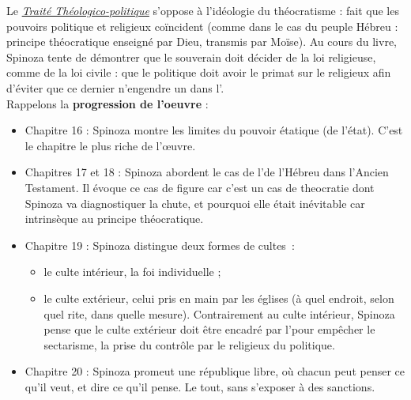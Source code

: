 \documentclass[a4paper,12pt]{article}
\newcommand{\ttp}[0]{\underline{\textit{Traité Théologico-politique}} }
\begin{document}
Le \ttp s'oppose à l'idéologie du théocratisme : fait que les pouvoirs politique et religieux coïncident (comme dans le cas du peuple Hébreu : principe théocratique enseigné par Dieu, transmis par Moïse). Au cours du livre, Spinoza tente de démontrer que le souverain doit décider de la loi religieuse, comme de la loi civile : que le politique doit avoir le primat sur le religieux afin d'éviter que ce dernier n'engendre un \etat dans l'\etat.\\

Rappelons la \textbf{progression de l'oeuvre} :
\begin{itemize}
    \item Chapitre 16 : Spinoza montre les limites du pouvoir étatique (de l'état). C'est le chapitre le plus riche de l'œuvre.
    \item Chapitres 17 et 18 : Spinoza abordent le cas de l'\etat de l'\etat Hébreu dans l'Ancien Testament. Il évoque ce cas de figure car c'est un cas de theocratie dont Spinoza va diagnostiquer la chute, et pourquoi elle était inévitable car intrinsèque au principe théocratique.
    \item Chapitre 19 : Spinoza distingue deux formes de cultes~: \begin{itemize}
        \item le culte intérieur, la foi individuelle ;
        \item le culte extérieur, celui pris en main par les églises (à quel endroit, selon quel rite, dans quelle mesure). Contrairement au culte intérieur, Spinoza pense que le culte extérieur doit être encadré par l'\etat pour empêcher le sectarisme, la prise du contrôle par le religieux du politique.
    \end{itemize}
    \item Chapitre 20 : Spinoza promeut une république libre, où chacun peut penser ce qu'il veut, et dire ce qu'il pense. Le tout, sans s'exposer à des sanctions.
\end{itemize}
\end{document}
